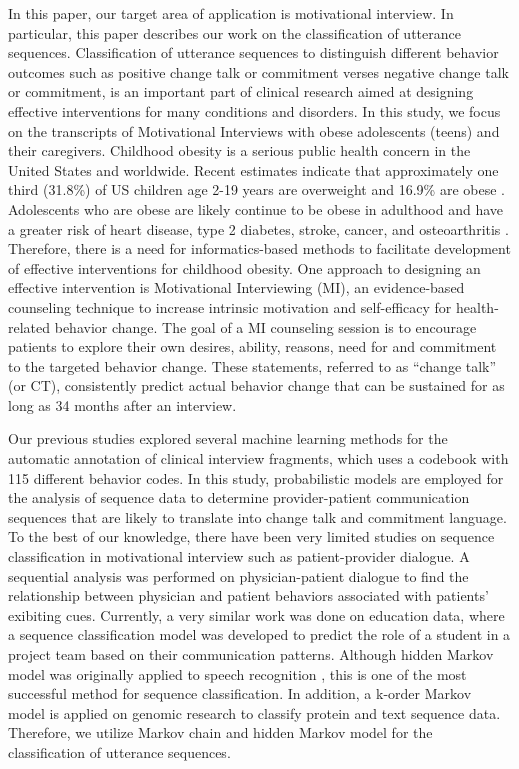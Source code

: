 \documentclass{amia}
\begin{document}
In this paper, our target area of application is motivational interview. In particular, this paper describes our work on the classification of utterance sequences. Classification of utterance sequences to distinguish different behavior outcomes such as positive change talk or commitment verses negative change talk or commitment, is an important part of clinical research aimed at designing effective interventions for many conditions and disorders. In this study, we focus on the transcripts of Motivational Interviews with obese adolescents (teens) and their caregivers. Childhood obesity is a serious public health concern in the United States and worldwide. Recent estimates indicate that approximately one third (31.8\%) of US children age 2-19 years are overweight and 16.9\% are obese \cite{ogden2012prevalence}. Adolescents who are obese are likely continue to be obese in adulthood and have a greater risk of heart disease, type 2 diabetes, stroke, cancer, and osteoarthritis \cite{general2010surgeon}. Therefore, there is a need for informatics-based methods to facilitate development of effective interventions for childhood obesity. One approach to designing an effective intervention is Motivational Interviewing (MI), an evidence-based counseling technique to increase intrinsic motivation and self-efficacy for health-related behavior change. The goal of a MI counseling session is to encourage patients to explore their own desires, ability, reasons, need for and commitment to the targeted behavior change. These statements, referred to as ``change talk'' (or CT), consistently predict actual behavior change that can be sustained for as long as 34 months after an interview. 

Our previous studies \cite{kotov2015interpretable, hasan2016study} explored several machine learning methods for the automatic annotation of clinical interview fragments, which uses a codebook \cite{carcone2013provider} with 115 different behavior codes. In this study, probabilistic models are employed for the analysis of sequence data to determine provider-patient communication sequences that are likely to translate into change talk and commitment language. To the best of our knowledge, there have been very limited studies on sequence classification in motivational interview such as patient-provider dialogue. A sequential analysis \cite{eide2004physician} was performed on physician-patient dialogue to find the relationship between physician and patient behaviors associated with patients' exibiting cues. Currently, a very similar work \cite{jaber2016multi} was done on education data, where a sequence classification model was developed to predict the role of a student in a project team based on their communication patterns. Although hidden Markov model was originally applied to speech recognition \cite{rabiner1989tutorial}, this is one of the most successful method \cite{mutsam2016maximum, eickeler1998hidden, srivastava2007hmm, won2004training, chai2001folk} for sequence classification. In addition, a k-order Markov model is applied on genomic research \cite{yakhnenko2005discriminatively} to classify protein and text sequence data. Therefore, we utilize Markov chain and hidden Markov model for the classification of utterance sequences. 
\end{document}
